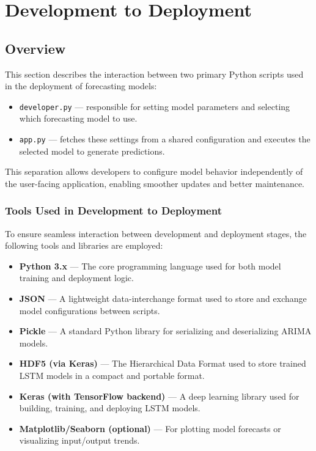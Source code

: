 %
%
%

\chapter{Development to Deployment}

\section{Overview}
This section describes the interaction between two primary Python scripts used in the deployment of forecasting models: 

\begin{itemize}
	\item \texttt{developer.py} — responsible for setting model parameters and selecting which forecasting model to use.
	\item \texttt{app.py} — fetches these settings from a shared configuration and executes the selected model to generate predictions.
\end{itemize}

This separation allows developers to configure model behavior independently of the user-facing application, enabling smoother updates and better maintenance.

\subsection{Tools Used in Development to Deployment}

To ensure seamless interaction between development and deployment stages, the following tools and libraries are employed:

\begin{itemize}
	\item \textbf{Python 3.x} --- The core programming language used for both model training and deployment logic.
	\item \textbf{JSON} --- A lightweight data-interchange format used to store and exchange model configurations between scripts.
	\item \textbf{Pickle} --- A standard Python library for serializing and deserializing ARIMA models.
	\item \textbf{HDF5 (via Keras)} --- The Hierarchical Data Format used to store trained LSTM models in a compact and portable format.
	\item \textbf{Keras (with TensorFlow backend)} --- A deep learning library used for building, training, and deploying LSTM models.
	\item \textbf{Matplotlib/Seaborn (optional)} --- For plotting model forecasts or visualizing input/output trends.
	
\end{itemize}

